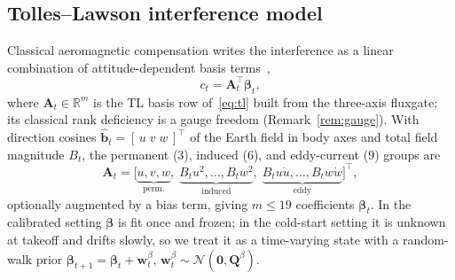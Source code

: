 \documentclass{IEEEtaes}
\begin{document}
\subsection{Tolles--Lawson interference model}
Classical aeromagnetic compensation writes the interference as a linear combination
of attitude-dependent basis terms~\cite{tolles1950,leliak1961,bickel1979},
\begin{equation}
c_t=\mathbf{A}_t^{\top}\boldsymbol{\beta}_t,
\label{eq:tl}
\end{equation}
where $\mathbf{A}_t\in\mathbb{R}^{m}$ is the TL basis row of~\eqref{eq:tl} built
from the three-axis fluxgate; its classical rank deficiency is a gauge freedom
(Remark~\ref{rem:gauge}). With direction cosines $\hat{\mathbf{b}}_t=[\,u\;v\;w\,]^{\top}$ of the
Earth field in body axes and total field magnitude $B_t$, the permanent (3),
induced (6), and eddy-current (9) groups are
\begin{equation}
\mathbf{A}_t=\big[\underbrace{u,v,w}_{\text{perm.}},\;
\underbrace{B_tu^2,\dots,B_tw^2}_{\text{induced}},\;
\underbrace{B_tu\dot u,\dots,B_tw\dot w}_{\text{eddy}}\big]^{\top},
\label{eq:tlbasis}
\end{equation}
optionally augmented by a bias term, giving $m\!\le\!19$ coefficients
$\boldsymbol{\beta}_t$. In the calibrated setting $\boldsymbol{\beta}$ is fit once
and frozen; in the cold-start setting it is unknown at takeoff and drifts slowly, so
we treat it as a time-varying state with a random-walk prior
$\boldsymbol{\beta}_{t+1}=\boldsymbol{\beta}_t+\mathbf{w}^{\beta}_t$,
$\mathbf{w}^{\beta}_t\sim\mathcal{N}(\mathbf{0},\mathbf{Q}^{\beta})$.
\end{document}
